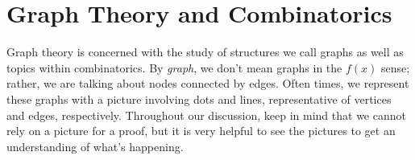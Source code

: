 \chapter{Graph Theory and Combinatorics}

Graph theory is concerned with the study of structures we call graphs as well as topics within combinatorics.
By \textit{graph}, we don't mean graphs in the $f(x)$ sense; rather, we are talking about nodes connected by edges.
Often times, we represent these graphs with a picture involving dots and lines, representative of vertices and edges, respectively.
Throughout our discussion, keep in mind that we cannot rely on a picture for a proof, but it is very helpful to see the pictures to get an understanding of what's happening.



